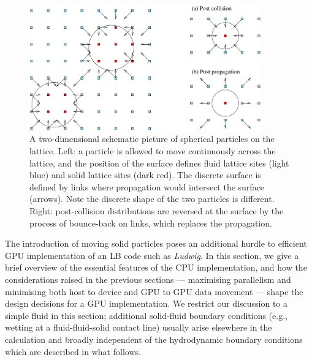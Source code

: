 \begin{figure}[t]
\centering
\includegraphics[width=10cm]{Chapters/chapter14/figures/colloid_new}
\caption{
A two-dimensional schematic picture of spherical particles on the lattice.
Left: a particle is allowed
to move continuously across the lattice, and the position of the
surface defines fluid lattice sites (light blue) and solid lattice
sites (dark red). The discrete surface is defined by links
where propagation would intersect the surface (arrows). Note the
discrete shape of the two particles is different. Right: post-collision
distributions are reversed at the surface by the process of bounce-back
on links, which replaces the propagation.
}
\label{ch14:fig:bbl}
\end{figure}




The introduction of moving solid particles poses an additional hurdle
to efficient GPU implementation of an LB code such as \textit{Ludwig}.
In this section, we give a brief overview of the essential features
of the CPU implementation, and how the considerations raised in the
previous sections --- maximising parallelism and minimising both
host to device and GPU to GPU data movement --- shape the design decisions
for a GPU implementation. We restrict our discussion to a simple fluid
in this section; additional solid-fluid boundary conditions (e.g.,
wetting at a fluid-fluid-solid contact line) usually arise elsewhere
in the calculation and broadly independent of the hydrodynamic boundary
conditions which are described in what follows.


